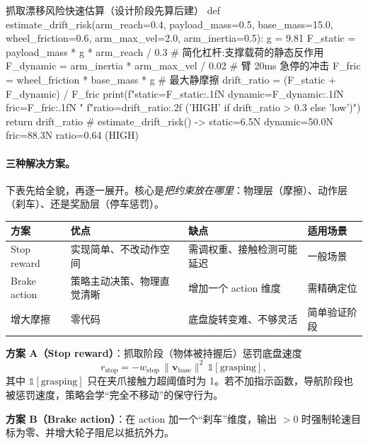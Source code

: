 \begin{codebox}[Python]{抓取漂移风险快速估算（设计阶段先算后建）}
def estimate_drift_risk(arm_reach=0.4, payload_mass=0.5, base_mass=15.0,
                        wheel_friction=0.6, arm_max_vel=2.0, arm_inertia=0.5):
    g = 9.81
    F_static  = payload_mass * g * arm_reach / 0.3   # 简化杠杆:支撑载荷的静态反作用
    F_dynamic = arm_inertia * arm_max_vel / 0.02     # 臂 20ms 急停的冲击
    F_fric    = wheel_friction * base_mass * g        # 最大静摩擦
    drift_ratio = (F_static + F_dynamic) / F_fric
    print(f"static={F_static:.1f}N dynamic={F_dynamic:.1f}N fric={F_fric:.1f}N "
          f"ratio={drift_ratio:.2f} ({'HIGH' if drift_ratio > 0.3 else 'low'})")
    return drift_ratio
# estimate_drift_risk()  ->  static=6.5N dynamic=50.0N fric=88.3N ratio=0.64 (HIGH)
\end{codebox}

\paragraph{三种解决方案。}下表先给全貌，再逐一展开。核心是\emph{把约束放在哪里}：物理层（摩擦）、动作层（刹车）、还是奖励层（停车惩罚）。

\begin{center}
\small
\begin{tabular}{@{}llll@{}}
\toprule
方案 & 优点 & 缺点 & 适用场景 \\
\midrule
Stop reward & 实现简单、不改动作空间 & 需调权重、接触检测可能延迟 & 一般场景 \\
Brake action & 策略主动决策、物理直觉清晰 & 增加一个 action 维度 & 需精确定位 \\
增大摩擦 & 零代码 & 底盘旋转变难、不够灵活 & 简单验证阶段 \\
\bottomrule
\end{tabular}
\end{center}

\textbf{方案 A（Stop reward）}：抓取阶段（物体被持握后）惩罚底盘速度
\begin{equation}
r_{\text{stop}}=-w_{\text{stop}}\,\lVert \mathbf{v}_{\text{base}}\rVert^2\,\mathbb{1}[\text{grasping}],
\label{eq:rlmc-wh-stop}
\end{equation}
其中 $\mathbb{1}[\text{grasping}]$ 只在夹爪接触力超阈值时为 1。若不加指示函数，导航阶段也被惩罚速度，策略会学“完全不移动”的保守行为。

\textbf{方案 B（Brake action）}：在 action 加一个“刹车”维度，输出 $>0$ 时强制轮速目标为零、并增大轮子阻尼以抵抗外力。

